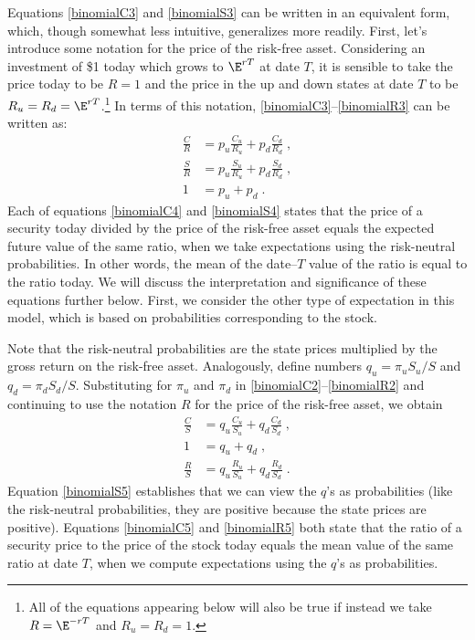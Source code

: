 Equations \eqref{binomialC3} and \eqref{binomialS3} can be written in an equivalent form, which, though somewhat less intuitive, generalizes more readily.  First, let's introduce some notation for the price of the risk-free asset.  Considering an investment of \$1 today which grows to $\E^{rT}$ at date $T$, it is sensible to take the price today to be $R=1$ and the price in the up and down states at date $T$ to be $R_u=R_d=\E^{rT}$.\footnote{All of the equations appearing below will also be true if instead we take $R=\E^{-rT}$ and $R_u=R_d=1$.}  In terms of this notation,  \eqref{binomialC3}--\eqref{binomialR3} can be written as:
\begin{subequations}\begin{align}
\frac{C}{R} &= p_u \frac{C_u}{R_u} + p_d \frac{C_d}{R_d}\;, \label{binomialC4}\\
\frac{S}{R} &= p_u \frac{S_u}{R_u} + p_d \frac{S_d}{R_d}\;, \label{binomialS4}\\
1&=p_u+p_d\;.\label{binomialR4}
\end{align}\end{subequations}
Each of equations \eqref{binomialC4} and \eqref{binomialS4} states that the price of a security today divided by the price of the risk-free asset equals the expected future value of the same ratio, when we take expectations using the risk-neutral probabilities.  In other words, the mean of the date--$T$ value of the ratio is equal to the ratio today.  We will discuss the interpretation and significance of these equations further below.  First, we consider the other type of expectation in this model, which is based on probabilities corresponding to the stock.

Note that the risk-neutral probabilities are the state prices multiplied by the gross return on the risk-free asset.  Analogously, define numbers $q_u = \pi_uS_u/S$ and $q_d = \pi_dS_d/S$.  Substituting for $\pi_u$ and $\pi_d$ in  \eqref{binomialC2}--\eqref{binomialR2} and continuing to use the notation $R$ for the price of the risk-free asset, we obtain
\begin{subequations}\begin{align}
\frac{C}{S} &= q_u \frac{C_u}{S_u} + q_d \frac{C_d}{S_d}\;, \label{binomialC5}\\
1 &= q_u + q_d\;,\label{binomialS5}\\
\frac{R}{S}& = q_u \frac{R_u}{S_u} + q_d \frac{R_d}{S_d}\;. \label{binomialR5}
\end{align}\end{subequations}
Equation \eqref{binomialS5} establishes that we can view the $q$'s as probabilities (like the risk-neutral probabilities, they are positive because the state prices are positive).  Equations \eqref{binomialC5} and \eqref{binomialR5} both state that the ratio of a security price to the price of the stock today equals the mean value of the same ratio at date $T$, when we compute expectations using the $q$'s as probabilities.  


